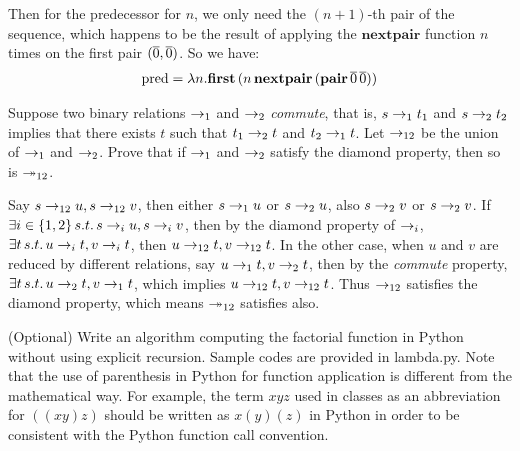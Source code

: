 \documentclass{homework}
\begin{document}
\begin{solution}
\begin{parts}
    Then for the predecessor for $n$, we only need the $(n+1)$-th pair of the sequence, which happens to be the result of applying the $\mathbf{nextpair}$ function $n$ times on the first pair $(\overline{0},\overline{0})$. So we have:
    \begin{align*}
      \mathrm{pred} = \lambda n.\mathbf{first}\,(n\,\mathbf{nextpair}\,(\mathbf{pair}\,\overline{0}\,\overline{0}))
    \end{align*}
  \end{parts}
\end{solution}

\begin{problem}
  Suppose two binary relations $\rightarrow_{1}$ and $\rightarrow_{2}$ \emph{commute},
  that is, $s \rightarrow_{1} t_{1}$ and $s \rightarrow_{2} t_{2}$ implies that there exists
  $t$ such that $t_{1} \rightarrow_{2} t$ and $t_{2} \rightarrow_{1} t$.
  Let $\rightarrow_{12}$ be the union of $\rightarrow_{1}$ and $\rightarrow_{2}$.
  Prove that if $\rightarrow_{1}$ and $\rightarrow_{2}$ satisfy the diamond property, then so
  is $\twoheadrightarrow_{12}$.
\end{problem}

\begin{solution}
  Say $s\rightarrow_{12}u,s\rightarrow_{12}v$, then either $s\rightarrow_1u$ or $s\rightarrow_2u$, also $s\rightarrow_2v$ or $s\rightarrow_2v$. If $\exists i\in\{1,2\}\,s.t.\,s\rightarrow_iu,s\rightarrow_iv$, then by the diamond property of $\rightarrow_i$, $\exists t\,s.t.\,u\rightarrow_it,v\rightarrow_it$, then $u\rightarrow_{12}t,v\rightarrow_{12}t$. In the other case, when $u$ and $v$ are reduced by different relations, say $u\rightarrow_1t,v\rightarrow_2t$, then by the \emph{commute} property, $\exists t\,s.t.\,u\rightarrow_2t,v\rightarrow_1t$, which implies $u\rightarrow_{12}t,v\rightarrow_{12}t$. Thus $\rightarrow_{12}$ satisfies the diamond property, which means $\twoheadrightarrow_{12}$ satisfies also.
\end{solution}

\begin{problem}
  (Optional) Write an algorithm computing the factorial function in Python
  without using explicit recursion.
  Sample codes are provided in \textsf{lambda.py}.
  Note that the use of parenthesis in Python for function application is
  different from the mathematical way.
  For example, the term $xyz$ used in classes as an abbreviation for $((xy)z)$
  should be written as $x(y)(z)$ in Python in order to be consistent with the
  Python function call convention.
\end{problem}
\end{document}
